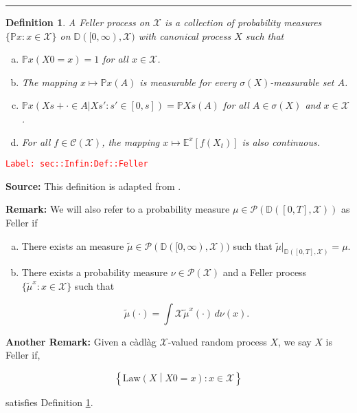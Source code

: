 \documentclass[12pt]{article}
\newcommand{\mb}{\mathbb}
\newcommand{\mc}{\mathcal}
\newcommand{\te}{\text}
\newcommand{\tr}{\textcolor{red}}
\newcommand{\labe}[1]{\tr{\texttt{Label: #1}}}
\newcommand{\lin}{\rule{\linewidth}{0.4 pt}}
\newcommand{\pr}{\mb{P}}							%
\newcommand{\exmu}[2]{\mb{E}^{#1}\left[#2\right]}	%
\newcommand{\cad}{\mb{D}}							%
\newcommand{\T}{T}								%
\newcommand{\x}{x}								%
\renewcommand{\t}{t}							%
\renewcommand{\tt}{s}							%
\newcommand{\ttt}{s'}							%
\newcommand{\X}{X}								%
\newcommand{\f}{f}								%
\newcommand{\cont}{\mc{C}}						%
\newcommand{\alt}[1]{\widetilde{#1}}			%
\newcommand{\m}{\mu}							%
\newcommand{\mm}{\nu}							%
\newcommand{\law}{\te{Law}}						%
\newcommand{\typset}{A}							%
\newcommand{\spce}{\mc{X}}						%
\newtheorem{defn}[thms]{Definition}
\begin{document}
\lin

\begin{defn}
A Feller process on \(\spce\) is a collection of probability measures \(\{\pr{\x}:\x \in \spce\}\) on \(\cad([0,\infty),\spce)\) with canonical process \(\X\) such that

\begin{enumerate}[(a)]
\item \(\pr{\x}(\X{}{0} = \x) = 1\) for all \(\x \in \spce\).

\item The mapping \(\x \mapsto \pr{\x}(\typset)\) is measurable for every \(\sigma(\X)\)-measurable set \(\typset\).

\item \(\pr{\x}(\X{}{\tt+\cdot} \in \typset|\X{}{\ttt}:\ttt \in [0,\tt]) = \pr{\X{}{\tt}}(\typset)\) for all \(\typset \in \sigma(\X)\) and \(\x \in \spce\).

\item For all \(\f\in \cont(\spce)\), the mapping \(\x\mapsto \exmu{\x}{\f(\X_{\t})}\) is also continuous.
\end{enumerate}
\label{sec::Infin:Def::Feller}
\end{defn}
\labe{sec::Infin:Def::Feller}

\textbf{Source: } This definition is adapted from \cite[Definition 1.1,1.2]{Lig85}.

\textbf{Remark: } We will also refer to a probability measure \(\m \in \mc{P}(\cad([0,\T],\spce))\) as Feller if

\begin{enumerate}[(a)]
\item There exists an measure \(\alt{\m}\in \mc{P}(\cad([0,\infty),\spce))\) such that \(\alt{\m}|_{\cad([0,T],\spce)} = \m\).

\item There exists a probability measure \(\mm\in \mc{P}(\spce)\) and a Feller process \(\{\alt{\m}^\x:\x \in \spce\}\) such that 

\[\alt{\m}(\cdot) = \int{\spce} \alt{\m}^\x(\cdot)\,d\mm(\x).\]
\end{enumerate}

\textbf{Another Remark: } Given a c\`adl\`ag \(\spce\)-valued random process \(\X{}{}\), we say \(\X{}{}\) is Feller if,

\[\left\{\law\left(\X{}{}\middle|\X{}{0} = \x{}{}\right): \x{}{} \in \spce\right\}\]

satisfies Definition \ref{sec::Infin:Def::Feller}.
\end{document}
